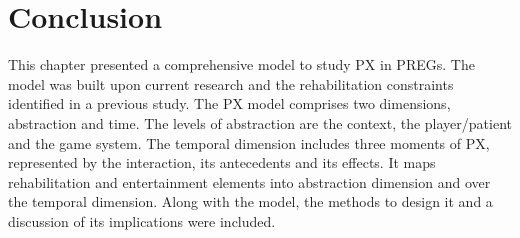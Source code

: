 \section{Conclusion} %
\label{sec:conclusion_model}

This chapter presented a comprehensive model to study \ac{PX} in \acp{PREG}. The model was built upon current research and the rehabilitation constraints identified in a previous study. The \ac{PX} model comprises two dimensions, abstraction and time. The levels of abstraction are the context, the player/patient and the game system. The temporal dimension includes three moments of \ac{PX}, represented by the interaction, its antecedents and its effects. It maps rehabilitation and entertainment elements into abstraction dimension and over the temporal dimension. Along with the model, the methods to design it and a discussion of its implications were included.